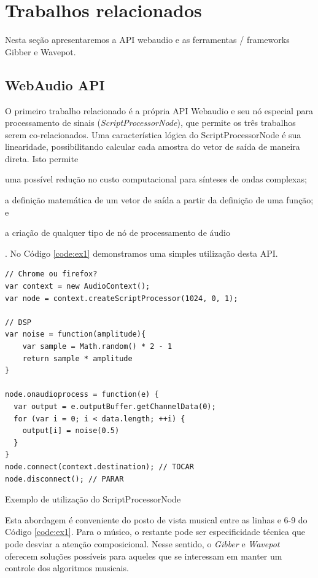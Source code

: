\section{Trabalhos relacionados}\label{sec:trabalhos}

Nesta seção apresentaremos a API webaudio e as ferramentas / frameworks Gibber e Wavepot.

\subsection*{WebAudio API}\label{sec:webaudioapi}

O primeiro trabalho relacionado é a própria API Webaudio e seu nó especial para processamento de sinais (\emph{ScriptProcessorNode}), que permite os três trabalhos serem co-relacionados.
Uma característica lógica do ScriptProcessorNode é sua linearidade, possibilitando calcular cada amostra do vetor de saída de maneira direta.
Isto permite \begin{inparaenum}
\item uma possível redução no custo  computacional para sínteses de ondas complexas;
\item a definição matemática de um vetor de saída a partir da definição de uma função; e
\item a criação de qualquer tipo de nó de processamento de áudio\end{inparaenum}.
No Código \ref{code:ex1} demonstramos uma simples utilização desta API.

\begin{listing}
\begin{verbatim}
// Chrome ou firefox?
var context = new AudioContext();
var node = context.createScriptProcessor(1024, 0, 1);

// DSP
var noise = function(amplitude){
    var sample = Math.random() * 2 - 1
    return sample * amplitude
}

node.onaudioprocess = function(e) {
  var output = e.outputBuffer.getChannelData(0);
  for (var i = 0; i < data.length; ++i) {
    output[i] = noise(0.5)
  }
}
node.connect(context.destination); // TOCAR
node.disconnect(); // PARAR
\end{verbatim}
\caption{Exemplo de utilização do ScriptProcessorNode}
\label{code:ex1}
\end{listing}

Esta abordagem é conveniente do posto de vista musical entre as linhas e 6-9 do Código \ref{code:ex1}. Para o músico, o restante pode ser  especificidade técnica que pode desviar a atenção composicional. Nesse sentido, o \emph{Gibber} e \emph{Wavepot} oferecem soluções possíveis para aqueles que se interessam em manter um controle dos algoritmos musicais.

